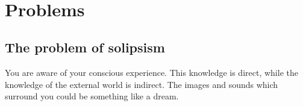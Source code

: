 
\newpage
~
\vspace{30px}

\begin{center}
\end{center}

\newpage

\section{Problems}

\subsection{The problem of solipsism}

You are aware of your conscious experience.
This knowledge is direct, while the knowledge of the external world is indirect.
The images and sounds which surround you could be something like a dream.\\

